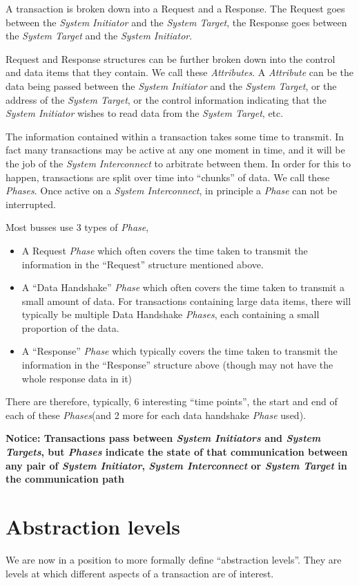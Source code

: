 \documentclass[12pt,oneside]{gsbook}
\newcommand{\master}{{\em System Initiator}\xspace}
\newcommand{\masters}{{\em System Initiators}\xspace}
\newcommand{\slave}{{\em System Target}\xspace}
\newcommand{\slaves}{{\em System Targets}\xspace}
\newcommand{\router}{{\em System Interconnect}\xspace}
\newcommand{\atom}{{\em Phase}\xspace}
\newcommand{\atoms}{{\em Phases}\xspace}
\newcommand{\quark}{{\em Attribute}\xspace}
\newcommand{\quarks}{{\em Attributes}\xspace}
\begin{document}
A transaction is broken down into a Request and a Response. The
Request goes between the \master and the \slave, the
Response goes between the \slave and the \master.

Request and Response structures can be further broken down into the
control and data items that they contain. We call these \quarks.
A \quark can be the data being passed between the \master
and the \slave, or the address of the \slave, or the control information
indicating that the \master wishes to read data from the \slave, etc.

The information contained within a transaction takes some time to
transmit. In fact many transactions may be active at any one moment in
time, and it will be the job of the \router to arbitrate between
them. In order for this to happen, transactions are split over time
into ``chunks'' of data.  We call these \atoms. Once active on a
\router, in principle a \atom can not be interrupted. 

Most busses use 3 types of \atom, 
\begin{itemize}
\item A Request \atom which often covers the time taken to transmit
the  information in the ``Request'' structure mentioned above.
\item  A ``Data Handshake'' \atom which often covers the time taken to
transmit a small amount of data. For transactions containing large data items,
there will typically be multiple Data Handshake \atoms, each containing
a small proportion of the data.
\item A ``Response'' \atom which typically covers the time taken to
transmit the information in the ``Response'' structure above (though
may not have the whole response data in it)
\end{itemize}

There are therefore, typically, 6  interesting ``time points'', the
start and end of each of these \atoms (and 2 more for each data
handshake \atom used).

{\bf Notice: Transactions pass between \masters and \slaves, but
\atoms indicate the state of that communication between any pair of
\master, \router or \slave in the communication path}

\section{Abstraction levels}

We are now in a position to more formally define ``abstraction
levels''. They are levels at which different aspects of a transaction
are of interest.
\end{document}
